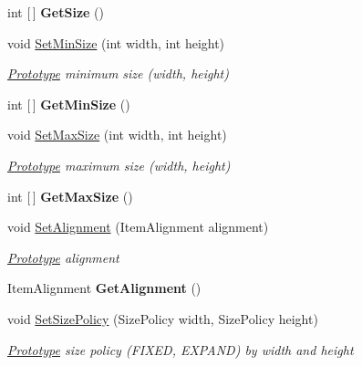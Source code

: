 \begin{DoxyCompactItemize}
\mbox{\label{class_space_v_i_l_1_1_prototype_a47c40a9a789167bcae20073057630424}} 
int \mbox{[}$\,$\mbox{]} {\bfseries Get\+Size} ()
\item 
void \mbox{\hyperlink{class_space_v_i_l_1_1_prototype_a799cc25e25e57ca5b89d488a38cd8063}{Set\+Min\+Size}} (int width, int height)
\begin{DoxyCompactList}\small\item\em \mbox{\hyperlink{class_space_v_i_l_1_1_prototype}{Prototype}} minimum size (width, height) \end{DoxyCompactList}\item 
\mbox{\label{class_space_v_i_l_1_1_prototype_ab86d0c5ef75b87247099e3d37e5b6e97}} 
int \mbox{[}$\,$\mbox{]} {\bfseries Get\+Min\+Size} ()
\item 
void \mbox{\hyperlink{class_space_v_i_l_1_1_prototype_a9870d610d71b1dddfb2ca9e20243d6b5}{Set\+Max\+Size}} (int width, int height)
\begin{DoxyCompactList}\small\item\em \mbox{\hyperlink{class_space_v_i_l_1_1_prototype}{Prototype}} maximum size (width, height) \end{DoxyCompactList}\item 
\mbox{\label{class_space_v_i_l_1_1_prototype_a982dccc2f5344e94f1e74432d4af585a}} 
int \mbox{[}$\,$\mbox{]} {\bfseries Get\+Max\+Size} ()
\item 
void \mbox{\hyperlink{class_space_v_i_l_1_1_prototype_ac9d6f8cfbc2716ee740a8a21eaff33a8}{Set\+Alignment}} (Item\+Alignment alignment)
\begin{DoxyCompactList}\small\item\em \mbox{\hyperlink{class_space_v_i_l_1_1_prototype}{Prototype}} alignment \end{DoxyCompactList}\item 
\mbox{\label{class_space_v_i_l_1_1_prototype_ac5fd13994a1de3b2e874d7b56be26aee}} 
Item\+Alignment {\bfseries Get\+Alignment} ()
\item 
void \mbox{\hyperlink{class_space_v_i_l_1_1_prototype_aef3665193fee08b031ad7401dafc8674}{Set\+Size\+Policy}} (Size\+Policy width, Size\+Policy height)
\begin{DoxyCompactList}\small\item\em \mbox{\hyperlink{class_space_v_i_l_1_1_prototype}{Prototype}} size policy (F\+I\+X\+ED, E\+X\+P\+A\+ND) by width and height \end{DoxyCompactList}\item 

\end{DoxyCompactItemize}
